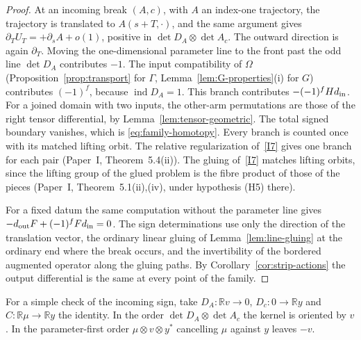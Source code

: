 \documentclass[11pt]{amsart}
\theoremstyle{definition}
\theoremstyle{remark}
\theoremstyle{plain}
\numberwithin{equation}{section}
\newcommand{\RR}{\mathbb R}
\newcommand{\ind}{\operatorname{ind}}
\begin{document}
\begin{proof}
At an incoming break $(A,c)$, with $A$ an index-one trajectory, the
trajectory is translated to $A(s+T,\cdot)$, and the same argument gives
$\partial_TU_T=+\partial_sA+o(1)$, positive in
$\det D_A\otimes\det A_c$. The outward direction is again $\partial_T$.
Moving the one-dimensional parameter line to the front past the odd
line $\det D_A$ contributes $-1$. The input compatibility of $\Omega$
(Proposition~\ref{prop:transport} for $\Gamma$,
Lemma~\ref{lem:G-properties}(i) for $G$) contributes $(-1)^{f}$,
because $\ind D_A=1$. This branch contributes $-(-1)^fHd_{\rm in}$.
For a joined domain with two inputs, the other-arm permutations are
those of the right tensor differential, by
Lemma~\ref{lem:tensor-geometric}. The total signed boundary vanishes,
which is \eqref{eq:family-homotopy}. Every branch is counted once with
its matched lifting orbit. The relative regularization of~\ref{I7} gives
one branch for each pair (Paper~I, Theorem~5.4(ii)). The gluing of~\ref{I7}
matches lifting orbits, since the lifting group of the glued problem is
the fibre product of those of the pieces (Paper~I, Theorem~5.1(ii),(iv),
under hypothesis (H5) there).

For a fixed datum the same computation without the parameter line
gives $-d_{\rm out}F+(-1)^fFd_{\rm in}=0$. The sign determinations use
only the direction of the translation vector, the ordinary linear
gluing of Lemma~\ref{lem:line-gluing} at the ordinary end where the
break occurs, and the invertibility of the bordered augmented operator
along the gluing paths. By Corollary~\ref{cor:strip-actions} the
output differential is the same at every point of the family.
\end{proof}

For a simple check of the incoming sign, take $D_A:\RR v\to0$,
$D_c:0\to\RR y$ and $C:\RR\mu\to\RR y$ the identity. In the order
$\det D_A\otimes\det A_c$ the kernel is oriented by $v$. In the
parameter-first order $\mu\otimes v\otimes y^*$ cancelling $\mu$
against $y$ leaves $-v$.
\end{document}
